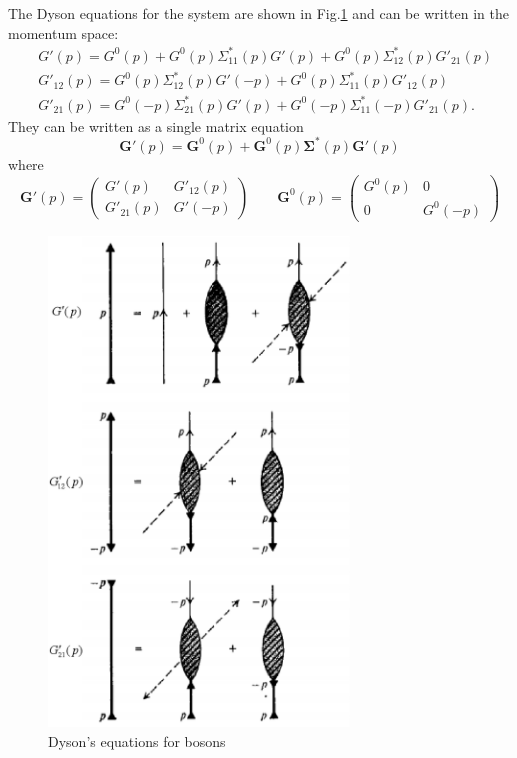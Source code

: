 \documentclass[12pt]{article}
\begin{document}
The Dyson equations for the system are shown in Fig.\ref{img7} and can be written 
in the momentum space:
\begin{subequations}
    \begin{align}
        &G'(p)=G^0(p)+G^0(p)\Sigma^*_{11}(p)G'(p)+G^0(p)\Sigma^*_{12}(p)G'_{21}(p)\label{Za}\\
        &G'_{12}(p)=G^0(p)\Sigma^*_{12}(p)G'(-p)+G^0(p)\Sigma^*_{11}(p)G'_{12}(p)\label{Zb}\\
        &G'_{21}(p)=G^0(-p)\Sigma^*_{21}(p)G'(p)+G^0(-p)\Sigma^*_{11}(-p)G'_{21}(p).\label{Zc}
    \end{align}
\end{subequations}
They can be written as a single matrix equation 
\begin{equation}\label{matrixGreen}
    \mathbf{G}'(p)=\mathbf{G}^0(p)+\mathbf{G}^0(p)\boldsymbol{\Sigma}^*(p)\mathbf{G}'(p)
\end{equation}
where 
\begin{equation}
    \mathbf{G}'(p)=\left(\begin{matrix}
        G'(p) &G'_{12}(p)\\
        G'_{21}(p) &G'(-p)
    \end{matrix}\right)\qquad
    \mathbf{G}^0(p)=\left(\begin{matrix}
        G^0(p) &0\\
        0 &G^0(-p)
    \end{matrix}\right)
\end{equation}
\begin{figure}[H]
    \centering
    \includegraphics[width=8cm]{p7.png}
    \renewcommand{\figurename}{Fig.}
    \caption{Dyson's equations for bosons}
    \label{img7}
\end{figure}
\end{document}
